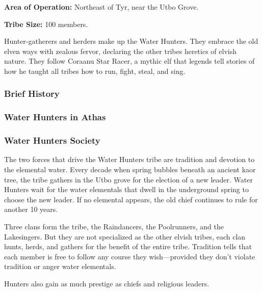 \textbf{Area of Operation:} Northeast of Tyr, near the Utbo Grove.

\textbf{Tribe Size:} 100 members.

Hunter-gatherers and herders make up the Water Hunters. They embrace the old elven ways with zealous fervor, declaring the other tribes heretics of elvish nature. They follow Coraanu Star Racer, a mythic elf that legends tell stories of how he taught all tribes how to run, fight, steal, and sing.

\subsubsection{Brief History}


\subsubsection{Water Hunters in Athas}

\subsubsection{Water Hunters Society}
The two forces that drive the Water Hunters tribe are tradition and devotion to the elemental water. Every decade when spring bubbles beneath an ancient kaor tree, the tribe gathers in the Utbo grove for the election of a new leader. Water Hunters wait for the water elementals that dwell in the underground spring to choose the new leader. If no elemental appears, the old chief continues to rule for another 10 years.

Three clans form the tribe, the Raindancers, the Poolrunners, and the Lakesingers. But they are not specialized as the other elvish tribes, each clan hunts, herds, and gathers for the benefit of the entire tribe. Tradition tells that each member is free to follow any course they wish---provided they don't violate tradition or anger water elementals.

Hunters also gain as much prestige as chiefs and religious leaders.
